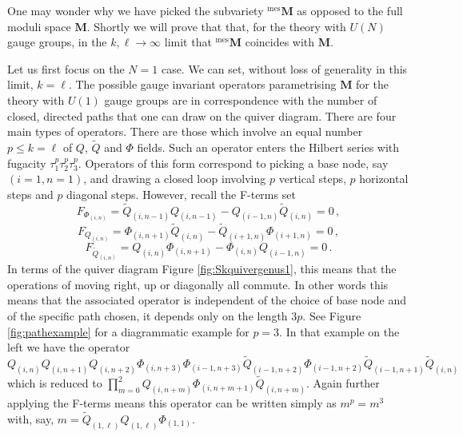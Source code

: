 \documentclass[main.tex]{subfiles}
\begin{document}
One may wonder why we have picked the subvariety ${}^{\text{mes}}\mathbf{M}$ as opposed to the full moduli space $\mathbf{M}$. Shortly we will prove that that, for the theory with $U(N)$ gauge groups, in the $k,\ell\to\infty$ limit that ${}^{\text{mes}}\mathbf{M}$ coincides with $\mathbf{M}$.

Let us first focus on the $N=1$ case. We can set, without loss of generality in this limit, $k=\ell$. The possible gauge invariant operators parametrising $\mathbf{M}$ for the theory with $U(1)$ gauge groups are in correspondence with the number of closed, directed paths that one can draw on the quiver diagram.  There are four main types of operators. There are those which involve an equal number $p\leq k=\ell$ of $Q$, $\widetilde{Q}$ and $\Phi$ fields. Such an operator enters the Hilbert series with fugacity $\tau_1^p\tau_2^p\tau_3^p$. Operators of this form correspond to picking a base node, say $(i=1,n=1)$, and drawing a closed loop involving $p$ vertical steps, $p$ horizontal steps and $p$ diagonal steps. However, recall the F-terms set
\begin{equation}
\label{eqn:PhiF}F_{\Phi_{(i,n)}}=\widetilde{Q}_{(i,n-1)}Q_{(i,n-1)}-Q_{(i-1,n)}\widetilde{Q}_{(i,n)}=0\,,
\end{equation}
\begin{equation}
\label{eqn:QF}F_{Q_{(i,n)}}=\Phi_{(i,n+1)}\widetilde{Q}_{(i,n)}-\widetilde{Q}_{(i+1,n)}\Phi_{(i+1,n)}=0\,,
\end{equation}
\begin{equation}
\label{eqn:QtF}F_{\widetilde{Q}_{(i,n)}}=Q_{(i,n)}\Phi_{(i,n+1)}-\Phi_{(i,n)}Q_{(i-1,n)}=0\,.
\end{equation}
In terms of the quiver diagram Figure \ref{fig:Skquivergenus1}, this means that the operations of moving right, up or diagonally all commute. In other words this means that the associated operator is independent of the choice of base node and of the specific path chosen, it depends only on the length $3p$. See Figure \ref{fig:pathexample} for a diagrammatic example for $p=3$. In that example on the left we have the operator \newline$Q_{(i,n)}Q_{(i,n+1)}Q_{(i,n+2)}\Phi_{(i,n+3)}\Phi_{(i-1,n+3)}\widetilde{Q}_{(i-1,n+2)}\Phi_{(i-1,n+2)}\widetilde{Q}_{(i-1,n+1)}\widetilde{Q}_{(i,n)}$ which is reduced to $\prod_{m=0}^2 Q_{(i,n+m)}\Phi_{(i,n+m+1)}\widetilde{Q}_{(i,n+m)}$. Again further applying the F-terms means this operator can be written simply as $m^p=m^3$ with, say, $m=\widetilde{Q}_{(1,\ell)}Q_{(1,\ell)}\Phi_{(1,1)}$.
\end{document}
